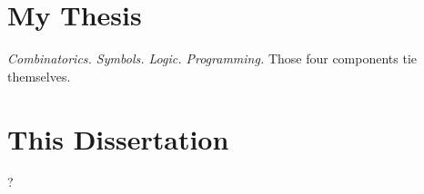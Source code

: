 

\section*{My Thesis}

\textit{Combinatorics. Symbols. Logic. Programming.} Those four components tie themselves.

\section*{This Dissertation}

?

